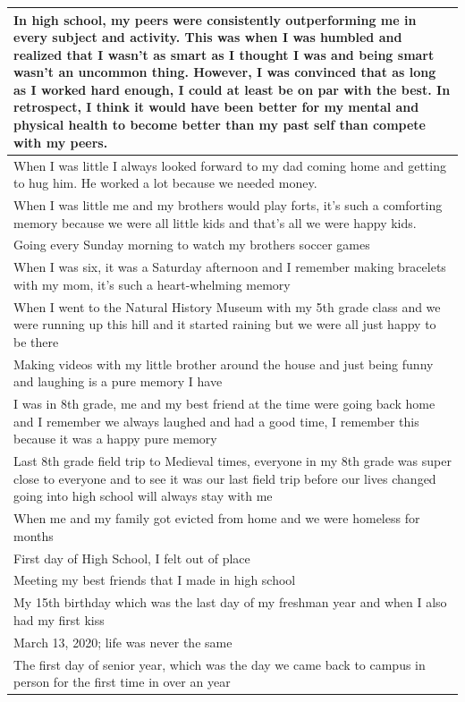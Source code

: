 \documentclass[
  .7em,
  letterpaper,
  DIV=11,
  numbers=noendperiod]{scrartcl}
\begin{document}
\begin{table}
\begin{tabular}{l}
\hline
In high school, my peers were consistently outperforming me in every subject and activity. This was when I was humbled and realized that I wasn’t as smart as I thought I was and being smart wasn’t an uncommon thing. However, I was convinced that as long as I worked hard enough, I could at least be on par with the best. In retrospect, I think it would have been better for my mental and physical health to become better than my past self than compete with my peers.\\
\hline
When I was little I always looked forward to my dad coming home and getting to hug him. He worked a lot because we needed money.\\
\hline
When I was little me and my brothers would play forts, it's such a comforting memory because we were all little kids and that's all we were happy kids.\\
\hline
Going every Sunday morning to watch my brothers soccer games\\
\hline
When I was six, it was a Saturday afternoon and I remember making bracelets with my mom, it's such a heart-whelming memory\\
\hline
When I went to the Natural History Museum with my 5th grade class and we were running up this hill and it started raining but we were all just happy to be there\\
\hline
Making videos with my little brother around the house and just being funny and laughing is a pure memory I have\\
\hline
I was in 8th grade, me and my best friend at the time were going back home and I remember we always laughed and had a good time, I remember this because it was a happy pure memory\\
\hline
Last 8th grade field trip to Medieval times, everyone in my 8th grade was super close to everyone and to see it was our last field trip before our lives changed going into high school will always stay with me\\
\hline
When me and my family got evicted from home and we were homeless for months\\
\hline
First day of High School, I felt out of place\\
\hline
Meeting my best friends that I made in high school\\
\hline
My 15th birthday which was the last day of my freshman year and when I also had my first kiss\\
\hline
March 13, 2020; life was never the same\\
\hline
The first day of senior year, which was the day we came back to campus in person for the first time in over an year\\

\end{tabular}
\end{table}
\end{document}
